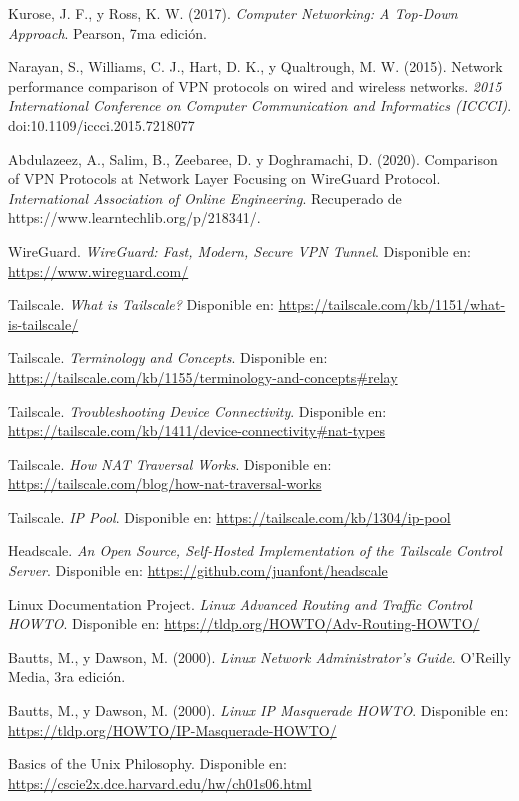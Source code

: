 \documentclass[letterpaper,12pt,oneside]{article}
\begin{document}
\begin{thebibliography}{99}

Kurose, J. F., y Ross, K. W. (2017). \textit{Computer Networking: A Top-Down Approach}. Pearson, 7ma edición.

Narayan, S., Williams, C. J., Hart, D. K., y Qualtrough, M. W. (2015). Network performance comparison of VPN protocols on wired and wireless networks. \textit{2015 International Conference on Computer Communication and Informatics (ICCCI)}. doi:10.1109/iccci.2015.7218077

Abdulazeez, A., Salim, B., Zeebaree, D. y Doghramachi, D. (2020). Comparison of VPN Protocols at Network Layer Focusing on WireGuard Protocol. \textit{International Association of Online Engineering}. Recuperado de https://www.learntechlib.org/p/218341/.

WireGuard. \textit{WireGuard: Fast, Modern, Secure VPN Tunnel}. Disponible en: \url{https://www.wireguard.com/}

Tailscale. \textit{What is Tailscale?} Disponible en: \url{https://tailscale.com/kb/1151/what-is-tailscale/}

Tailscale. \textit{Terminology and Concepts}. Disponible en: \url{https://tailscale.com/kb/1155/terminology-and-concepts#relay}

Tailscale. \textit{Troubleshooting Device Connectivity}. Disponible en: \url{https://tailscale.com/kb/1411/device-connectivity#nat-types}

Tailscale. \textit{How NAT Traversal Works}. Disponible en: \url{https://tailscale.com/blog/how-nat-traversal-works}

Tailscale. \textit{IP Pool}. Disponible en: \url{https://tailscale.com/kb/1304/ip-pool}

Headscale. \textit{An Open Source, Self-Hosted Implementation of the Tailscale Control Server}. Disponible en: \url{https://github.com/juanfont/headscale}

Linux Documentation Project. \textit{Linux Advanced Routing and Traffic Control HOWTO}. Disponible en: \url{https://tldp.org/HOWTO/Adv-Routing-HOWTO/}

Bautts, M., y Dawson, M. (2000). \textit{Linux Network Administrator’s Guide}. O’Reilly Media, 3ra edición.

Bautts, M., y Dawson, M. (2000). \textit{Linux IP Masquerade HOWTO}. Disponible en: \url{https://tldp.org/HOWTO/IP-Masquerade-HOWTO/}

Basics of the Unix Philosophy. Disponible en: \url{https://cscie2x.dce.harvard.edu/hw/ch01s06.html}

\end{thebibliography}
\end{document}
